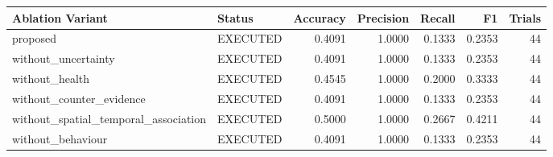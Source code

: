 \begin{tabular}{llrrrrr}
\toprule
Ablation Variant & Status & Accuracy & Precision & Recall & F1 & Trials \\
\midrule
proposed & EXECUTED & 0.4091 & 1.0000 & 0.1333 & 0.2353 & 44 \\
without\_uncertainty & EXECUTED & 0.4091 & 1.0000 & 0.1333 & 0.2353 & 44 \\
without\_health & EXECUTED & 0.4545 & 1.0000 & 0.2000 & 0.3333 & 44 \\
without\_counter\_evidence & EXECUTED & 0.4091 & 1.0000 & 0.1333 & 0.2353 & 44 \\
without\_spatial\_temporal\_association & EXECUTED & 0.5000 & 1.0000 & 0.2667 & 0.4211 & 44 \\
without\_behaviour & EXECUTED & 0.4091 & 1.0000 & 0.1333 & 0.2353 & 44 \\
\bottomrule
\end{tabular}
